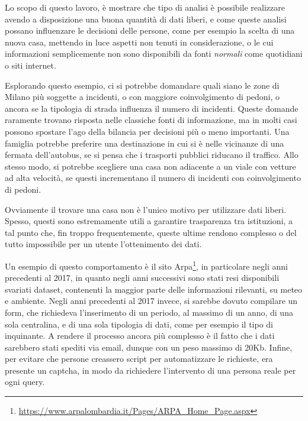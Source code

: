 \documentclass[a4paper]{report}
\newcommand{\quotestyle}[1]{\textit{#1}}
\begin{document}

Lo scopo di questo lavoro, è mostrare che tipo di analisi è possibile realizzare 
avendo a disposizione una buona quantità di dati liberi, e come queste analisi possano 
influenzare le decisioni delle persone, come per esempio la scelta di una nuova casa, 
mettendo in luce aspetti non tenuti in considerazione, o le cui informazioni semplicemente 
non sono disponibili da fonti \quotestyle{normali} come quotidiani o siti internet.

Esplorando questo esempio, ci si potrebbe domandare quali siano le zone 
di Milano più soggette a incidenti, o con maggiore coinvolgimento di pedoni, 
o ancora se la tipologia di strada influenza il numero di incidenti. 
Queste domande raramente trovano risposta nelle classiche fonti di informazione, 
ma in molti casi possono spostare l'ago della bilancia per decisioni più o meno 
importanti.
Una famiglia potrebbe preferire una destinazione in cui si è nelle vicinanze di 
una fermata dell'autobus, se si pensa che i trasporti pubblici riducano 
il traffico. 
Allo stesso modo, si potrebbe scegliere una casa non adiacente 
a un viale con vetture ad alta velocità, se questi incrementano il numero di 
incidenti con coinvolgimento di pedoni.

Ovviamente il trovare una casa non è l'unico motivo per utilizzare dati liberi. 
Spesso, questi sono estremamente utili a garantire trasparenza tra istituzioni, 
a tal punto che, fin troppo frequentemente, queste ultime rendono complesso o 
del tutto impossibile per un utente l'ottenimento dei dati.

Un esempio di questo comportamento è il sito 
Arpa\footnote{\url{https://www.arpalombardia.it/Pages/ARPA_Home_Page.aspx}}, 
in particolare negli anni precedenti al 2017, in quanto negli anni successivi 
sono stati resi disponibili svariati dataset, contenenti la maggior parte delle 
informazioni rilevanti, su meteo e ambiente.
Negli anni precedenti al 2017 invece, si sarebbe dovuto compilare un form, che 
richiedeva l'inserimento di un periodo, al massimo di un anno, di una sola 
centralina, e di una sola tipologia di dati, come per esempio il tipo di inquinante. 
A rendere il processo ancora più complesso è il fatto che i dati sarebbero stati 
spediti via email, dunque con un peso massimo di 20Kb.
Infine, per evitare che persone creassero script per automatizzare le richieste, 
era presente un captcha, in modo da richiedere l'intervento di una persona 
reale per ogni query.
\end{document}
